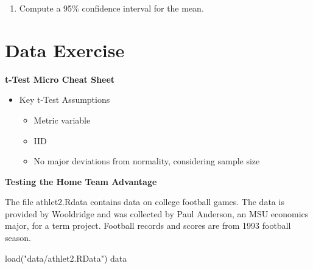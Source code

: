 \documentclass[
]{book}
\newenvironment{Shaded}{\begin{snugshade}}{\end{snugshade}}
\newcommand{\FunctionTok}[1]{\textcolor[rgb]{0.00,0.00,0.00}{#1}}
\newcommand{\NormalTok}[1]{#1}
\newcommand{\StringTok}[1]{\textcolor[rgb]{0.31,0.60,0.02}{#1}}
\providecommand{\tightlist}{%
  \setlength{\itemsep}{0pt}\setlength{\parskip}{0pt}}
\theoremstyle{definition}
\theoremstyle{definition}
\theoremstyle{definition}
\theoremstyle{definition}
\theoremstyle{remark}
\begin{document}
\begin{quote}
\end{quote}

\begin{enumerate}
\def\labelenumi{\arabic{enumi}.}
\setcounter{enumi}{7}
\tightlist
\item
  Compute a 95\% confidence interval for the mean.
\end{enumerate}

\hypertarget{data-exercise}{%
\section{Data Exercise}\label{data-exercise}}

\textbf{t-Test Micro Cheat Sheet}

\begin{itemize}
\tightlist
\item
  Key t-Test Assumptions

  \begin{itemize}
  \tightlist
  \item
    Metric variable
  \item
    IID
  \item
    No major deviations from normality, considering sample size
  \end{itemize}
\end{itemize}

\textbf{Testing the Home Team Advantage}

The file athlet2.Rdata contains data on college football games. The data is provided by Wooldridge and was collected by Paul Anderson, an MSU economics major, for a term project. Football records and scores are from 1993 football season.

\begin{Shaded}
\begin{Highlighting}[]
\FunctionTok{load}\NormalTok{(}\StringTok{"data/athlet2.RData"}\NormalTok{)}
\NormalTok{data}
\end{Highlighting}
\end{Shaded}
\end{document}
